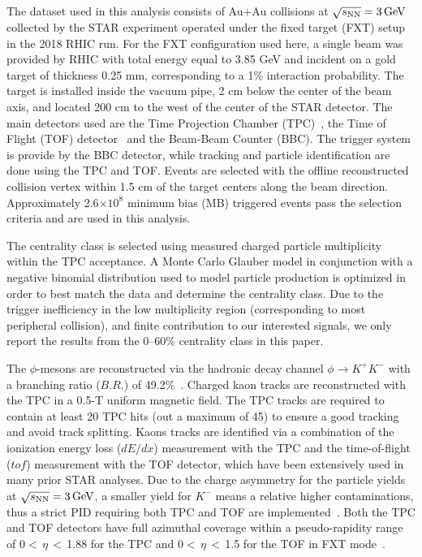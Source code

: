 \documentclass[%
 reprint,	
showpacs,
 amsmath,amssymb,
 aps,
 prc,
]{revtex4-1}
\begin{document}
The dataset used in this analysis consists of Au+Au collisions at ${\sqrt{s_{\rm NN}} = \rm{3\,GeV}}$ collected by the STAR experiment operated under the fixed target (FXT) setup in the 2018 RHIC run. For the FXT configuration used here, a single beam was provided by RHIC with total energy equal to 3.85 GeV and incident on a gold target of thickness 0.25 mm, corresponding to a 1\% interaction probability.
The target is installed inside the vacuum pipe, 2 cm below the center of the beam axis, and located 200 cm to the west of the center of the STAR detector. The main detectors used are the Time Projection Chamber (TPC)~\cite{TPC}, the Time of Flight (TOF) detector~\cite{TOF} and the Beam-Beam Counter (BBC). The trigger system is provide by the BBC detector, while tracking and particle identification are done using the TPC and TOF. Events are selected with the offline reconstructed collision vertex within 1.5 cm of the target centers along the beam direction. Approximately 2.6$\times 10^{8}$ minimum bias (MB) triggered events pass the selection criteria and are used in this analysis. 

The centrality class is selected using measured charged particle multiplicity within the TPC acceptance. 
A Monte Carlo Glauber model in conjunction with a negative binomial distribution used to model particle production is optimized in order to best match the data and determine the centrality class. Due to the trigger inefficiency in the low multiplicity region (corresponding to most peripheral collision), and finite contribution to our interested signals, we only report the results from the 0--60\% centrality class in this paper.

The $\phi$-mesons are reconstructed via the hadronic decay channel $\phi\rightarrow K^+K^-$ with a branching ratio ($B.R.$) of 49.2\%~\cite{pdg}. Charged kaon tracks are reconstructed with the TPC in a 0.5-T uniform magnetic field. The TPC tracks are required to contain at least 20 TPC hits (out a maximum of 45) to ensure a good tracking and avoid track splitting. Kaons tracks are identified via a combination of the ionization energy loss ($dE/dx$) measurement with the TPC and the time-of-flight ($tof$) measurement with the TOF detector, which have been extensively used in many prior STAR analyses. Due to the charge asymmetry for the particle yields at ${\sqrt{s_{\rm NN}} = \rm{3\,GeV}}$, a smaller yield for $K^-$ means a relative higher contaminations, thus a strict PID requiring both TPC and TOF are implemented~\cite{Xu:2008th,Shao:2005iu}. Both the TPC and TOF detectors have full azimuthal coverage within a pseudo-rapidity range of 0$<$\,$\eta$\,$<$\,1.88 for the TPC and 0$<$\,$\eta$\,$<$\,1.5 for the TOF in FXT mode~\cite{TPC,TOF}.
\end{document}

